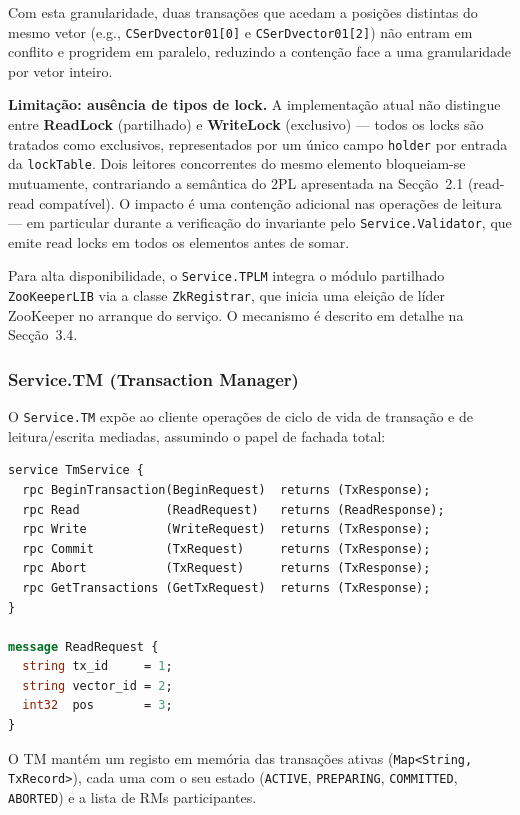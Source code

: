 Com esta granularidade, duas transações que acedam a posições distintas do mesmo vetor
(e.g., \texttt{CSerDvector01[0]} e \texttt{CSerDvector01[2]}) não entram em conflito e
progridem em paralelo, reduzindo a contenção face a uma granularidade por vetor inteiro.

\textbf{Limitação: ausência de tipos de lock.}
A implementação atual não distingue entre \textbf{ReadLock} (partilhado) e
\textbf{WriteLock} (exclusivo) --- todos os locks são tratados como exclusivos,
representados por um único campo \texttt{holder} por entrada da \texttt{lockTable}. Dois
leitores concorrentes do mesmo elemento bloqueiam-se mutuamente, contrariando a semântica
do 2PL apresentada na Secção~2.1 (read-read compatível). O impacto é uma contenção
adicional nas operações de leitura --- em particular durante a verificação do invariante
pelo \texttt{Service.Validator}, que emite read locks em todos os elementos antes de somar.

Para alta disponibilidade, o \texttt{Service.TPLM} integra o módulo partilhado
\texttt{ZooKeeperLIB} via a classe \texttt{ZkRegistrar}, que inicia uma eleição de líder
ZooKeeper no arranque do serviço. O mecanismo é descrito em detalhe na Secção~3.4.

\subsubsection*{Service.TM (Transaction Manager)}

O \texttt{Service.TM} expõe ao cliente operações de ciclo de vida de transação e de
leitura/escrita mediadas, assumindo o papel de fachada total:

\begin{lstlisting}[language=proto, caption={Contrato gRPC do \texttt{Service.TM} (Tm.proto).}]
service TmService {
  rpc BeginTransaction(BeginRequest)  returns (TxResponse);
  rpc Read            (ReadRequest)   returns (ReadResponse);
  rpc Write           (WriteRequest)  returns (TxResponse);
  rpc Commit          (TxRequest)     returns (TxResponse);
  rpc Abort           (TxRequest)     returns (TxResponse);
  rpc GetTransactions (GetTxRequest)  returns (TxResponse);
}

message ReadRequest {
  string tx_id     = 1;
  string vector_id = 2;
  int32  pos       = 3;
}
\end{lstlisting}

O TM mantém um registo em memória das transações ativas (\texttt{Map\textless String,
TxRecord\textgreater}), cada uma com o seu estado (\texttt{ACTIVE}, \texttt{PREPARING},
\texttt{COMMITTED}, \texttt{ABORTED}) e a lista de RMs participantes.

